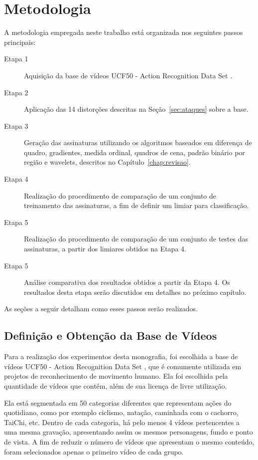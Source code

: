 
\chapter{Metodologia}
\label{chap:metodologia}


A metodologia empregada neste trabalho está organizada nos seguintes passos principais:

\begin{description}
\item[Etapa 1] Aquisição da base de vídeos UCF50 - Action Recognition Data Set \citeauthor{reddy2013recognizing}.
\item[Etapa 2] Aplicação das 14 distorções descritas na Seção~\ref{sec:ataques} sobre a base.
\item[Etapa 3] Geração das assinaturas utilizando os algoritmos baseados em diferença de quadro, gradientes, medida ordinal, quadros de cena, padrão binário por região e wavelets, descritos no Capítulo~\ref{chap:revisao}.
\item[Etapa 4] Realização do procedimento de comparação de um conjunto de treinamento das assinaturas, a fim de definir um limiar para classificação.
\item[Etapa 5] Realização do procedimento de comparação de um conjunto de testes das assinaturas, a partir dos limiares obtidos na Etapa 4.
\item[Etapa 5] Análise comparativa dos resultados obtidos a partir da Etapa 4. Os resultados desta etapa serão discutidos em detalhes no próximo capítulo.
\end{description}

As seções a seguir detalham como esses passos serão realizados.

\section{Definição e Obtenção da Base de Vídeos}
\label{sec:database}

Para a realização dos experimentos desta monografia, foi escolhida a base de vídeos UCF50 - Action Recognition Data Set \citeauthor{reddy2013recognizing}, que é comumente utilizada em projetos de reconhecimento de movimento humano. Ela foi escolhida pela quantidade de vídeos que contém, além de sua licença de livre utilização.

Ela está segmentada em 50 categorias diferentes que representam ações do quotidiano, como por exemplo ciclismo, natação, caminhada com o cachorro, TaiChi, etc. Dentro de cada categoria, há pelo menos 4 vídeos pertencentes a uma mesma gravação, apresentando assim os mesmos personagens, fundo e ponto de vista. A fim de reduzir o número de vídeos que apresentam o mesmo conteúdo, foram selecionados apenas o primeiro vídeo de cada grupo.

